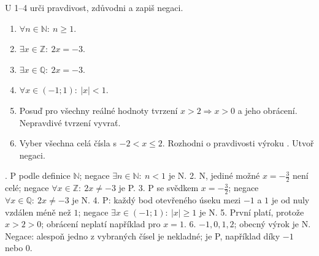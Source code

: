 \documentclass[11pt,a4paper]{article}
\begin{document}
\begin{zadaniReseniBox}[title={Domácí úkol},breakable=false]
U 1–4 urči pravdivost, zdůvodni a zapiš negaci.
\begin{enumerate}[label=\arabic*)]
\item $\forall n\in\mathbb N:\ n\ge1$.
\item $\exists x\in\mathbb Z:\ 2x=-3$.
\item $\exists x\in\mathbb Q:\ 2x=-3$.
\item $\forall x\in(-1;1):\ |x|<1$.
\item Posuď pro všechny reálné hodnoty tvrzení
$x>2\Rightarrow x>0$ a jeho obrácení. Nepravdivé tvrzení vyvrať.
\item Vyber všechna celá čísla s $-2<x\le2$. Rozhodni o pravdivosti
výroku . Utvoř negaci.
\end{enumerate}
. P podle definice $\mathbb N$; negace $\exists n\in\mathbb N:\ n<1$ je N.
2. N, jediné možné $x=-\frac32$ není celé;
negace $\forall x\in\mathbb Z:\ 2x\ne-3$ je P.
3. P se svědkem $x=-\frac32$; negace $\forall x\in\mathbb Q:\ 2x\ne-3$ je N.
4. P: každý bod otevřeného úseku mezi $-1$ a $1$ je od nuly vzdálen
méně než $1$; negace $\exists x\in(-1;1):\ |x|\ge1$ je N.
5. První platí, protože $x>2>0$; obrácení neplatí například pro $x=1$.
6. $-1,0,1,2$; obecný výrok je N. Negace: alespoň jedno z vybraných
čísel je nekladné; je P, například díky $-1$ nebo $0$.
\end{zadaniReseniBox}
\end{document}
